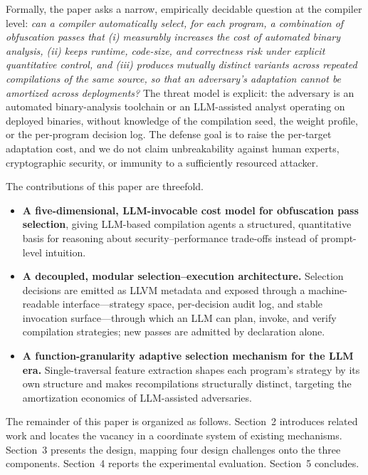 \documentclass[pdflatex,sn-mathphys-num]{sn-jnl}
\theoremstyle{thmstyleone}%
\theoremstyle{thmstyletwo}%
\theoremstyle{thmstylethree}%
\begin{document}
Formally, the paper asks a narrow, empirically decidable question at the
compiler level: \emph{can a compiler automatically select, for each program, a
combination of obfuscation passes that (i) measurably increases the cost of
automated binary analysis, (ii) keeps runtime, code-size, and correctness risk
under explicit quantitative control, and (iii) produces mutually distinct
variants across repeated compilations of the same source, so that an
adversary's adaptation cannot be amortized across deployments?} The threat
model is explicit: the adversary is an automated binary-analysis toolchain or
an LLM-assisted analyst operating on deployed binaries, without knowledge of
the compilation seed, the weight profile, or the per-program decision log. The
defense goal is
to raise the per-target adaptation cost, and we do not claim unbreakability
against human experts, cryptographic security, or immunity to a sufficiently
resourced attacker.

The contributions of this paper are threefold.
\begin{itemize}
\item \textbf{A five-dimensional, LLM-invocable cost model for obfuscation pass
  selection}, giving LLM-based compilation agents a structured, quantitative basis
  for reasoning about security--performance trade-offs instead of prompt-level
  intuition.
\item \textbf{A decoupled, modular selection--execution architecture.} Selection
  decisions are emitted as LLVM metadata and exposed through a machine-readable
  interface---strategy space, per-decision audit log, and stable invocation
  surface---through which an LLM can plan, invoke, and verify compilation
  strategies; new passes are admitted by declaration alone.
\item \textbf{A function-granularity adaptive selection mechanism for the LLM
  era.} Single-traversal feature extraction shapes each program's strategy by its
  own structure and makes recompilations structurally distinct, targeting the
  amortization economics of LLM-assisted adversaries.
\end{itemize}

The remainder of this paper is organized as follows. Section~2 introduces
related work and locates the vacancy in a coordinate system of existing
mechanisms. Section~3 presents the design, mapping four design challenges
onto the three components. Section~4 reports the experimental evaluation.
Section~5 concludes.

\end{document}
